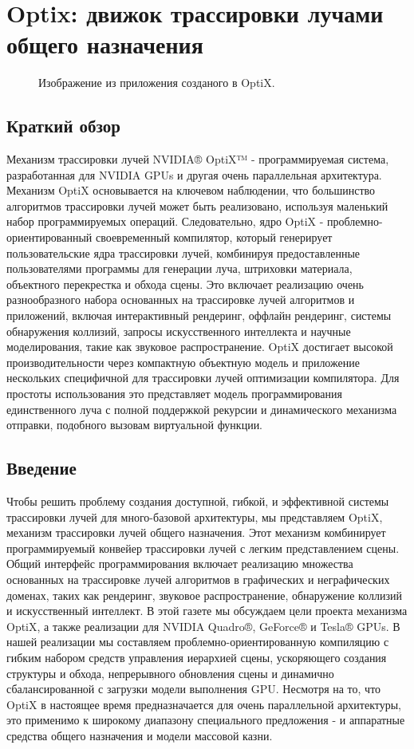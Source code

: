 \section{Optix: движок трассировки лучами общего назначения}
\begin{figure}[h]
\caption{Изображение из приложения созданого в OptiX.}
\label{audi}
\end{figure}
\subsection{Краткий обзор}
Механизм трассировки лучей NVIDIA® OptiX™ - программируемая система, разработанная для NVIDIA GPUs и другая очень параллельная архитектура.
Механизм OptiX основывается на ключевом наблюдении, что большинство алгоритмов трассировки лучей может быть реализовано, используя маленький набор программируемых операций. Следовательно, ядро OptiX - проблемно-ориентированный своевременный компилятор, который генерирует пользовательские ядра трассировки лучей, комбинируя предоставленные пользователями программы для генерации луча, штриховки материала, объектного перекрестка и обхода сцены. Это включает реализацию очень разнообразного набора основанных на трассировке лучей алгоритмов и приложений, включая интерактивный рендеринг, оффлайн рендеринг, системы обнаружения коллизий, запросы искусственного интеллекта и научные моделирования, такие как звуковое распространение. OptiX достигает высокой производительности через компактную объектную модель и приложение нескольких специфичной для трассировки лучей оптимизации компилятора. Для простоты использования это представляет модель программирования единственного луча с полной поддержкой рекурсии и динамического механизма отправки, подобного вызовам виртуальной функции.

\subsection{Введение}
Чтобы решить проблему создания доступной, гибкой, и эффективной системы трассировки лучей для много-базовой архитектуры, мы представляем OptiX, механизм трассировки лучей общего назначения. Этот механизм комбинирует программируемый конвейер трассировки лучей с легким представлением сцены. Общий интерфейс программирования включает реализацию множества основанных на трассировке лучей алгоритмов в графических и неграфических доменах, таких как рендеринг, звуковое распространение, обнаружение коллизий и искусственный интеллект.
В этой газете мы обсуждаем цели проекта механизма OptiX, а также реализации для NVIDIA Quadro®, GeForce® и Tesla® GPUs. В нашей реализации мы составляем проблемно-ориентированную компиляцию с гибким набором средств управления иерархией сцены, ускоряющего создания структуры и обхода, непрерывного обновления сцены и динамично сбалансированной с загрузки модели выполнения GPU. Несмотря на то, что OptiX в настоящее время предназначается для очень параллельной архитектуры, это применимо к широкому диапазону специального предложения - и аппаратные средства общего назначения и модели массовой казни.

